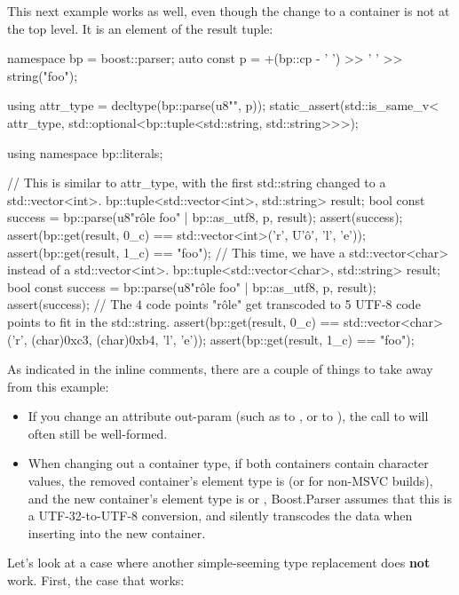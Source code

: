 \documentclass{MyBook}
\begin{document}
This next example works as well, even though the change to a container is not at the top level. It is an element of the result tuple:

\begin{code}
namespace bp = boost::parser;
auto const p = +(bp::cp - ' ') >> ' ' >> string("foo");

using attr_type = decltype(bp::parse(u8"", p));
static_assert(std::is_same_v<
              attr_type,
              std::optional<bp::tuple<std::string, std::string>>>);

using namespace bp::literals;

{
    // This is similar to attr_type, with the first std::string changed to a std::vector<int>.
    bp::tuple<std::vector<int>, std::string> result;
    bool const success = bp::parse(u8"rôle foo" | bp::as_utf8, p, result);
    assert(success);
    assert(bp::get(result, 0_c) == std::vector<int>({'r', U'ô', 'l', 'e'}));
    assert(bp::get(result, 1_c) == "foo");
}
{
    // This time, we have a std::vector<char> instead of a std::vector<int>.
    bp::tuple<std::vector<char>, std::string> result;
    bool const success = bp::parse(u8"rôle foo" | bp::as_utf8, p, result);
    assert(success);
    // The 4 code points "rôle" get transcoded to 5 UTF-8 code points to fit in the std::string.
    assert(bp::get(result, 0_c) == std::vector<char>({'r', (char)0xc3, (char)0xb4, 'l', 'e'}));
    assert(bp::get(result, 1_c) == "foo");
}
\end{code}

As indicated in the inline comments, there are a couple of things to take away from this example:

\begin{itemize}
\item
  If you change an attribute out-param (such as  to , or  to ), the call to  will often still be well-formed.
\item
  When changing out a container type, if both containers contain character values, the removed container's element type is  (or  for non-MSVC builds), and the new container's element type is  or , Boost.Parser assumes that this is a UTF-32-to-UTF-8 conversion, and silently transcodes the data when inserting into the new container.
\end{itemize}

Let's look at a case where another simple-seeming type replacement does \textbf{not} work. First, the case that works:
\end{document}
